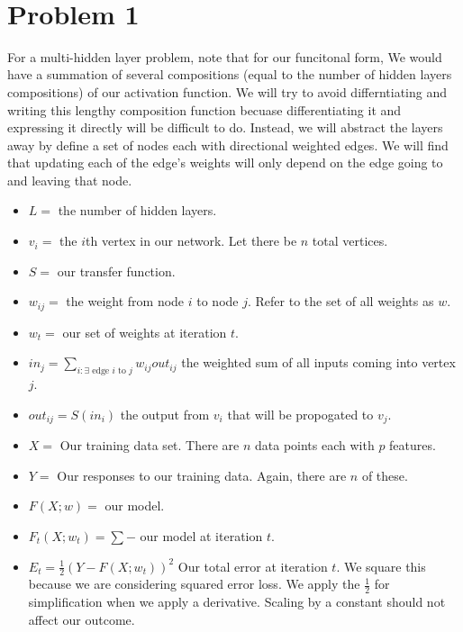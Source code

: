 \documentclass[11pt]{article}
\begin{document}
\begin{center}

\ \\
\end{center}

\section*{Problem 1}

\vspace{5 mm}
\noindent
For a multi-hidden layer problem, note that for our funcitonal form, We would 
have a summation of several compositions (equal to the number of hidden layers 
compositions) of our activation function. We will try to avoid differntiating 
and writing this lengthy composition function becuase differentiating it and 
expressing it directly will be difficult to do. Instead, we will abstract the 
layers away by define a set of nodes each with directional weighted edges. We 
will find that updating each of the edge's weights will only depend on the 
edge going to and leaving that node. 

\begin{itemize}
\item $L = $ the number of hidden layers.
\item $v_{i} = $ the $i$th vertex in our network. Let there be $n$ total 
vertices.
\item $S = $ our transfer function.
\item $w_{ij} = $ the weight from node $i$ to node $j$. Refer to the set of all 
weights as $w$.
\item $w_{t} = $ our set of weights at iteration $t$.
\item $in_{j} = \sum_{i: \exists \text{ edge } i \text{ to } j} w_{ij} out_{ij}$ 
the weighted sum of all inputs coming into vertex $j$.
\item $out_{ij} = S(in_{i})$ the output from $v_{i}$ that will be propogated 
to $v_{j}$.
\item $X = $ Our training data set. There are $n$ data points each with $p$ 
features.
\item $Y = $ Our responses to our training data. Again, there are $n$ of these.
\item $F(X; w) = $ our model.
\item $F_{t}(X; w_{t}) = \sum-$ our model at iteration $t$.
\item $E_{t} = \frac{1}{2}(Y - F(X; w_{t}))^{2} $ Our total error at iteration 
$t$. We square this because we are considering squared error loss. We apply the 
$\frac{1}{2}$ for simplification when we apply a derivative. Scaling by a 
constant should not affect our outcome.
\end{itemize}
\end{document}
